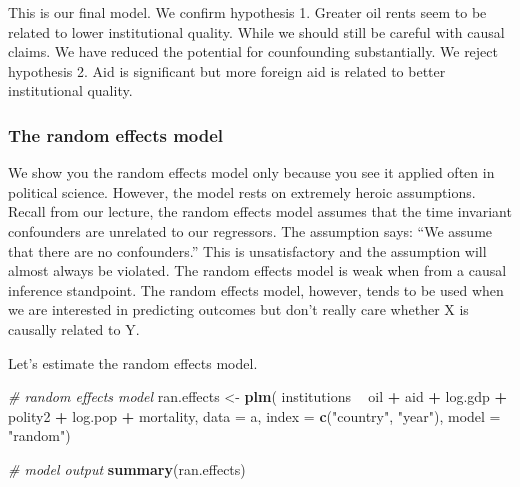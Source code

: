 \documentclass[]{article}
\newenvironment{Shaded}{\begin{snugshade}}{\end{snugshade}}
\newcommand{\KeywordTok}[1]{\textcolor[rgb]{0.13,0.29,0.53}{\textbf{#1}}}
\newcommand{\DataTypeTok}[1]{\textcolor[rgb]{0.13,0.29,0.53}{#1}}
\newcommand{\StringTok}[1]{\textcolor[rgb]{0.31,0.60,0.02}{#1}}
\newcommand{\CommentTok}[1]{\textcolor[rgb]{0.56,0.35,0.01}{\textit{#1}}}
\newcommand{\OperatorTok}[1]{\textcolor[rgb]{0.81,0.36,0.00}{\textbf{#1}}}
\newcommand{\NormalTok}[1]{#1}
\theoremstyle{definition}
\theoremstyle{definition}
\theoremstyle{definition}
\theoremstyle{remark}
\begin{document}
This is our final model. We confirm hypothesis 1. Greater oil rents seem
to be related to lower institutional quality. While we should still be
careful with causal claims. We have reduced the potential for
counfounding substantially. We reject hypothesis 2. Aid is significant
but more foreign aid is related to better institutional quality.

\subsubsection{The random effects model}\label{the-random-effects-model}

We show you the random effects model only because you see it applied
often in political science. However, the model rests on extremely heroic
assumptions. Recall from our lecture, the random effects model assumes
that the time invariant confounders are unrelated to our regressors. The
assumption says: ``We assume that there are no confounders.'' This is
unsatisfactory and the assumption will almost always be violated. The
random effects model is weak when from a causal inference standpoint.
The random effects model, however, tends to be used when we are
interested in predicting outcomes but don't really care whether X is
causally related to Y.

Let's estimate the random effects model.

\begin{Shaded}
\begin{Highlighting}[]
\CommentTok{# random effects model}
\NormalTok{ran.effects <-}\StringTok{ }\KeywordTok{plm}\NormalTok{(}
\NormalTok{  institutions }\OperatorTok{~}\StringTok{ }\NormalTok{oil }\OperatorTok{+}\StringTok{ }\NormalTok{aid }\OperatorTok{+}\StringTok{ }\NormalTok{log.gdp }\OperatorTok{+}\StringTok{ }\NormalTok{polity2 }\OperatorTok{+}\StringTok{ }\NormalTok{log.pop }\OperatorTok{+}\StringTok{ }\NormalTok{mortality,}
  \DataTypeTok{data =}\NormalTok{ a,}
  \DataTypeTok{index =} \KeywordTok{c}\NormalTok{(}\StringTok{"country"}\NormalTok{, }\StringTok{"year"}\NormalTok{),}
  \DataTypeTok{model =} \StringTok{"random"}\NormalTok{)}

\CommentTok{# model output}
\KeywordTok{summary}\NormalTok{(ran.effects)}
\end{Highlighting}
\end{Shaded}
\end{document}
